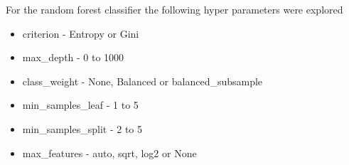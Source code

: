 For the random forest classifier the following hyper parameters were explored

\begin{itemize}
  \item criterion - Entropy or Gini
  \item max\_depth - 0 to 1000
  \item class\_weight - None, Balanced or balanced\_subsample
  \item min\_samples\_leaf - 1 to 5
  \item min\_samples\_split - 2 to 5
  \item max\_features - auto, sqrt, log2 or None
\end{itemize}